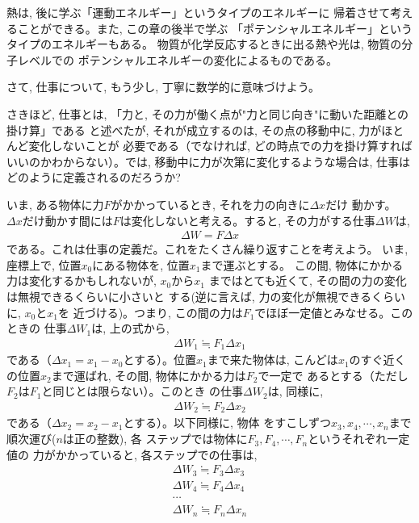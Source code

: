 熱は, 後に学ぶ「運動エネルギー」というタイプのエネルギーに
帰着させて考えることができる。また, この章の後半で学ぶ
「ポテンシャルエネルギー」というタイプのエネルギーもある。
物質が化学反応するときに出る熱や光は, 物質の分子レベルでの
ポテンシャルエネルギーの変化によるものである。\mv

さて, 仕事について, もう少し, 丁寧に数学的に意味づけよう。

さきほど, 仕事とは, 「力と, その力が働く点が"力と同じ向き"に動いた距離との掛け算」である
と述べたが, それが成立するのは, その点の移動中に, 力がほとんど変化しないことが
必要である（でなければ, どの時点での力を掛け算すればいいのかわからない）。では, 
移動中に力が次第に変化するような場合は, 仕事はどのように定義されるのだろうか? 

いま, ある物体に力$F$がかかっているとき, それを力の向きに$\Delta x$だけ
動かす。 $\Delta x$だけ動かす間には$F$は変化しないと考える。すると, その力がする仕事$\Delta W$は, 
\begin{eqnarray}
\Delta W=F\Delta x \label{eq:work}
\end{eqnarray}
である。これは仕事の定義だ。これをたくさん繰り返すことを考えよう。
いま, 座標上で, 位置$x_0$にある物体を, 位置$x_1$まで運ぶとする。
この間, 物体にかかる力は変化するかもしれないが, $x_0$から$x_1$
まではとても近くて, その間の力の変化は無視できるくらいに小さいと
する(逆に言えば, 力の変化が無視できるくらいに, $x_0$と$x_1$を
近づける)。つまり, この間の力は$F_1$でほぼ一定値とみなせる。このときの
仕事$\Delta W_1$は, 上の式から, 
\begin{eqnarray}\Delta W_1\fallingdotseq F_1\Delta x_1\end{eqnarray}
である（$\Delta x_1=x_1-x_0$とする）。位置$x_1$まで来た物体は, 
こんどは$x_1$のすぐ近くの位置$x_2$まで運ばれ, その間, 物体にかかる力は$F_2$で一定で
あるとする（ただし$F_2$は$F_1$と同じとは限らない）。このとき
の仕事$\Delta W_2$は, 同様に, 
\begin{eqnarray}\Delta W_2\fallingdotseq F_2\Delta x_2\end{eqnarray}
である（$\Delta x_2=x_2-x_1$とする）。以下同様に, 物体
をすこしずつ$x_3, x_4, \cdots, x_n$まで順次運び($n$は正の整数), 各
ステップでは物体に$F_3, F_4, \cdots, F_n$というそれぞれ一定値の
力がかかっていると, 各ステップでの仕事は, 
\begin{eqnarray}
\Delta W_3\fallingdotseq F_3\Delta x_3\nonumber\\
\Delta W_4\fallingdotseq F_4\Delta x_4\nonumber\\
\cdots\nonumber\\
\Delta W_n\fallingdotseq F_n\Delta x_n\label{eq:W_nF_nDx_n}
\end{eqnarray}
